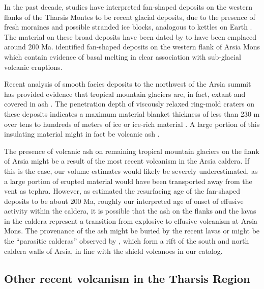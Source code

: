 \documentclass[12pt,letter]{article}
\begin{document}
In the past decade, studies have interpreted fan-shaped deposits on the western flanks of the Tharsis Montes to be recent glacial deposits, due to the presence of fresh moraines and possible stranded ice blocks, analogous to kettles on Earth \citep{shean2007recent,kadish2014middle,scanlon2015remnant}. The material on these broad deposits have been dated by \citet{kadish2014middle} to have been emplaced around 200 Ma. \citet{scanlon2015volcanism} identified fan-shaped deposits on the western flank of Arsia Mons which contain evidence of basal melting in clear association with sub-glacial volcanic eruptions. 

Recent analysis of smooth facies deposits to the northwest of the Arsia summit has provided evidence that tropical mountain glaciers are, in fact, extant and covered in ash \citep{scanlon2015remnant}. The penetration depth of viscously relaxed ring-mold craters on these deposits indicates a maximum material blanket thickness of less than 230 m over tens to hundreds of meters of ice or ice-rich material \citep{head2014preservation}. A large portion of this insulating material might in fact be volcanic ash \citep{wilson1994mars,mouginis2002prodigious}.

The presence of volcanic ash on remaining tropical mountain glaciers on the flank of Arsia might be a result of the most recent volcanism in the Arsia caldera. If this is the case, our volume estimates would likely be severely underestimated, as a large portion of erupted material would have been transported away from the vent as tephra. However, as \citet{kadish2014middle} estimated the resurfacing age of the fan-shaped deposits to be about 200 Ma, roughly our interpreted age of onset of effusive activity within the caldera, it is possible that the ash on the flanks and the lavas in the caldera represent a transition from explosive to effusive volcanism at Arsia Mons. The provenance of the ash might be buried by the recent lavas or might be the ``parasitic calderas'' observed by \citet{crumpler1996calderas}, which form a rift of the south and north caldera walls of Arsia, in line with the shield volcanoes in our catalog.

\subsection{Other recent volcanism in the Tharsis Region}
\end{document}
